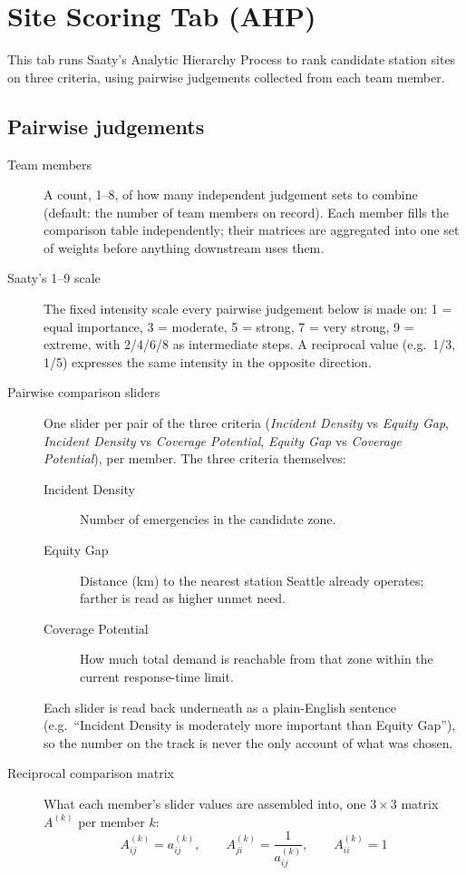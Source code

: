 \documentclass[11pt]{article}
\begin{document}
\section{Site Scoring Tab (AHP)}
This tab runs Saaty's Analytic Hierarchy Process to rank candidate station
sites on three criteria, using pairwise judgements collected from each team
member.

\subsection{Pairwise judgements}
\begin{description}
  \item[Team members] A count, 1--8, of how many independent judgement sets
    to combine (default: the number of team members on record). Each member
    fills the comparison table independently; their matrices are aggregated
    into one set of weights before anything downstream uses them.
  \item[Saaty's 1--9 scale] The fixed intensity scale every pairwise judgement
    below is made on: 1 = equal importance, 3 = moderate, 5 = strong, 7 = very
    strong, 9 = extreme, with 2/4/6/8 as intermediate steps. A reciprocal value
    (e.g.\ 1/3, 1/5) expresses the same intensity in the opposite direction.
  \item[Pairwise comparison sliders] One slider per pair of the three criteria
    (\emph{Incident Density} vs \emph{Equity Gap}, \emph{Incident Density} vs
    \emph{Coverage Potential}, \emph{Equity Gap} vs \emph{Coverage
    Potential}), per member. The three criteria themselves:
    \begin{description}
      \item[Incident Density] Number of emergencies in the candidate zone.
      \item[Equity Gap] Distance (km) to the nearest station Seattle already
        operates; farther is read as higher unmet need.
      \item[Coverage Potential] How much total demand is reachable from that
        zone within the current response-time limit.
    \end{description}
    Each slider is read back underneath as a plain-English sentence (e.g.\
    ``Incident Density is moderately more important than Equity Gap''), so the
    number on the track is never the only account of what was chosen.
  \item[Reciprocal comparison matrix] What each member's slider values are
    assembled into, one $3\times3$ matrix $A^{(k)}$ per member $k$:
    \[
      A^{(k)}_{ij} = a^{(k)}_{ij}, \qquad A^{(k)}_{ji} = \frac{1}{a^{(k)}_{ij}},
      \qquad A^{(k)}_{ii} = 1
    \]
\end{description}
\end{document}
